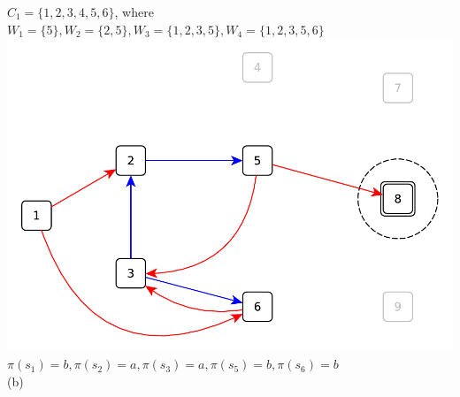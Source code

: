 \documentclass[11pt,a4paper]{article}
\begin{document}
$C_1=\{1,2,3,4,5,6\}$, where $W_1=\{5\},W_2=\{2,5\},W_3=\{1,2,3,5\},W_4=\{1,2,3,5,6\}$\\
\includegraphics[scale=0.4]{13_2_2.pdf}\\
$\pi(s_1)=b,\pi(s_2)=a,\pi(s_3)=a,\pi(s_5)=b,\pi(s_6)=b$
\\
(b)

\label{lastpage}
\end{document}
